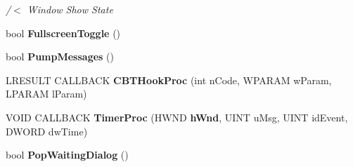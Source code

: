 \begin{DoxyCompactItemize}
\begin{DoxyCompactList}\small\item\em /$<$ Window Show State \end{DoxyCompactList}\item 
bool \textbf{ Fullscreen\+Toggle} ()
\item 
bool \textbf{ Pump\+Messages} ()
\item 
L\+R\+E\+S\+U\+LT C\+A\+L\+L\+B\+A\+CK \textbf{ C\+B\+T\+Hook\+Proc} (int n\+Code, W\+P\+A\+R\+AM w\+Param, L\+P\+A\+R\+AM l\+Param)
\item 
V\+O\+ID C\+A\+L\+L\+B\+A\+CK \textbf{ Timer\+Proc} (H\+W\+ND \textbf{ h\+Wnd}, U\+I\+NT u\+Msg, U\+I\+NT id\+Event, D\+W\+O\+RD dw\+Time)
\item 
bool \textbf{ Pop\+Waiting\+Dialog} ()
\end{DoxyCompactItemize}
